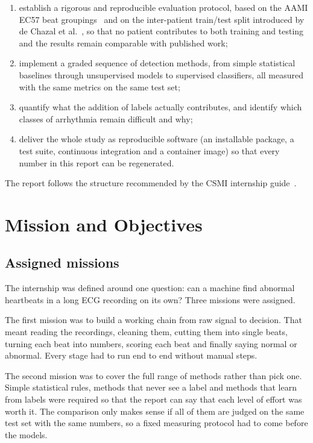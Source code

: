 \documentclass[a4paper, 12pt]{article}
\begin{document}
\begin{enumerate}[label=(O\arabic*)]
  \item establish a rigorous and reproducible evaluation protocol, based on the AAMI EC57
        beat groupings~\cite{aami2012ec57} and on the inter-patient train/test split
        introduced by de Chazal et al.~\cite{dechazal2004}, so that no patient contributes to
        both training and testing and the results remain comparable with published work;
  \item implement a graded sequence of detection methods, from simple statistical baselines
        through unsupervised models to supervised classifiers, all measured with the same
        metrics on the same test set;
  \item quantify what the addition of labels actually contributes, and identify which classes
        of arrhythmia remain difficult and why;
  \item deliver the whole study as reproducible software (an installable package, a test
        suite, continuous integration and a container image) so that every number in this
        report can be regenerated.
\end{enumerate}

The report follows the structure recommended by the CSMI internship
guide~\cite{csmiguide}. 



\section{Mission and Objectives} \label{sec:missions}

\subsection{Assigned missions} \label{subsec:missions}

The internship was defined around one question: can a machine find abnormal heartbeats
in a long ECG recording on its own? Three missions were assigned.

The first mission was to build a working chain from raw signal to decision. That 
meant reading the recordings, cleaning them, cutting them into single beats,
turning each beat into numbers, scoring each beat and finally saying normal or abnormal.
Every stage had to run end to end without manual steps.

The second mission was to cover the full range of methods rather than pick one.
Simple statistical rules, methods that never see a label and methods that learn from 
labels were required so that the report can say that each level of effort was worth it.
The comparison only makes sense if all of them are judged on the same test set with the
same numbers, so a fixed measuring protocol had to come before the models.
\end{document}
